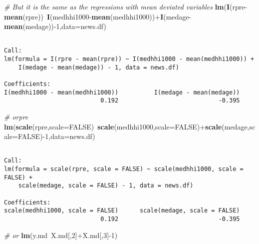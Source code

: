 \documentclass[10pt,]{article}
\newenvironment{Shaded}{\begin{snugshade}}{\end{snugshade}}
\newcommand{\KeywordTok}[1]{\textcolor[rgb]{0.13,0.29,0.53}{\textbf{{#1}}}}
\newcommand{\DataTypeTok}[1]{\textcolor[rgb]{0.13,0.29,0.53}{{#1}}}
\newcommand{\DecValTok}[1]{\textcolor[rgb]{0.00,0.00,0.81}{{#1}}}
\newcommand{\CommentTok}[1]{\textcolor[rgb]{0.56,0.35,0.01}{\textit{{#1}}}}
\newcommand{\OtherTok}[1]{\textcolor[rgb]{0.56,0.35,0.01}{{#1}}}
\newcommand{\NormalTok}[1]{{#1}}
\begin{document}
\begin{Shaded}
\begin{Highlighting}[]
\CommentTok{# But it is the same as the regressions with mean deviated variables}
\KeywordTok{lm}\NormalTok{(}\KeywordTok{I}\NormalTok{(rpre-}\KeywordTok{mean}\NormalTok{(rpre))~}\KeywordTok{I}\NormalTok{(medhhi1000-}\KeywordTok{mean}\NormalTok{(medhhi1000))+}\KeywordTok{I}\NormalTok{(medage-}\KeywordTok{mean}\NormalTok{(medage))-}\DecValTok{1}\NormalTok{,}\DataTypeTok{data=}\NormalTok{news.df)}
\end{Highlighting}
\end{Shaded}

\begin{verbatim}

Call:
lm(formula = I(rpre - mean(rpre)) ~ I(medhhi1000 - mean(medhhi1000)) + 
    I(medage - mean(medage)) - 1, data = news.df)

Coefficients:
I(medhhi1000 - mean(medhhi1000))          I(medage - mean(medage))  
                           0.192                            -0.395  
\end{verbatim}

\begin{Shaded}
\begin{Highlighting}[]
\CommentTok{# orpre}
\KeywordTok{lm}\NormalTok{(}\KeywordTok{scale}\NormalTok{(rpre,}\DataTypeTok{scale=}\OtherTok{FALSE}\NormalTok{)~}\KeywordTok{scale}\NormalTok{(medhhi1000,}\DataTypeTok{scale=}\OtherTok{FALSE}\NormalTok{)+}\KeywordTok{scale}\NormalTok{(medage,}\DataTypeTok{scale=}\OtherTok{FALSE}\NormalTok{)-}\DecValTok{1}\NormalTok{,}\DataTypeTok{data=}\NormalTok{news.df)}
\end{Highlighting}
\end{Shaded}

\begin{verbatim}

Call:
lm(formula = scale(rpre, scale = FALSE) ~ scale(medhhi1000, scale = FALSE) + 
    scale(medage, scale = FALSE) - 1, data = news.df)

Coefficients:
scale(medhhi1000, scale = FALSE)      scale(medage, scale = FALSE)  
                           0.192                            -0.395  
\end{verbatim}

\begin{Shaded}
\begin{Highlighting}[]
\CommentTok{# or}
\KeywordTok{lm}\NormalTok{(y.md~X.md[,}\DecValTok{2}\NormalTok{]+X.md[,}\DecValTok{3}\NormalTok{]-}\DecValTok{1}\NormalTok{)}
\end{Highlighting}
\end{Shaded}
\end{document}
